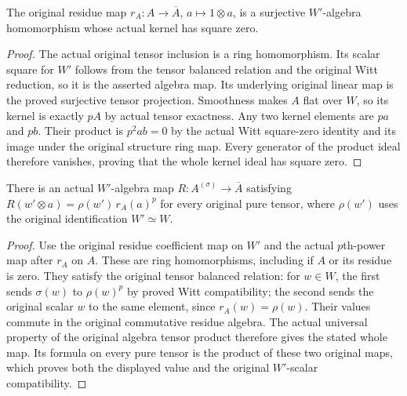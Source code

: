 \begin{lemma}
\label{lem:witt-two-smooth-algebra-reduction}
\leanok
{}
The original residue map $r_A:A\to\overline A$,
$a\mapsto1\otimes a$, is a surjective $W'$-algebra
homomorphism whose actual kernel has square zero.
\end{lemma}
\begin{proof}
The actual original tensor inclusion is a ring
homomorphism. Its scalar square for $W'$ follows
from the tensor balanced relation and the original
Witt reduction, so it is the asserted algebra map.
Its underlying original linear map is the proved
surjective tensor projection. Smoothness makes
$A$ flat over $W$, so its kernel is exactly $pA$
by actual tensor exactness. Any two kernel elements
are $pa$ and $pb$. Their product is $p^2ab=0$
by the actual Witt square-zero identity and its
image under the original structure ring map.
Every generator of the product ideal therefore
vanishes, proving that the whole kernel ideal
has square zero.
\end{proof}

\begin{theorem}
\label{thm:witt-two-residue-relative-frobenius}
\leanok
{}
There is an actual $W'$-algebra map
$R:A^{(\sigma)}\to\overline A$ satisfying
$R(w'\otimes a)=\rho(w')\,r_A(a)^p$
for every original pure tensor, where $\rho(w')$
uses the original identification $W'\simeq W$.
\end{theorem}
\begin{proof}
Use the original residue coefficient map on $W'$
and the actual $p$th-power map after $r_A$ on
$A$. These are ring homomorphisms, including if
$A$ or its residue is zero. They satisfy the
original tensor balanced relation: for $w\in W$,
the first sends $\sigma(w)$ to $\rho(w)^p$ by
proved Witt compatibility; the second sends the
original scalar $w$ to the same element, since
$r_A(w)=\rho(w)$. Their values commute in the
original commutative residue algebra. The actual
universal property of the original algebra tensor
product therefore gives the stated whole map.
Its formula on every pure tensor is the product
of these two original maps, which proves both
the displayed value and the original $W'$-scalar
compatibility.
\end{proof}

